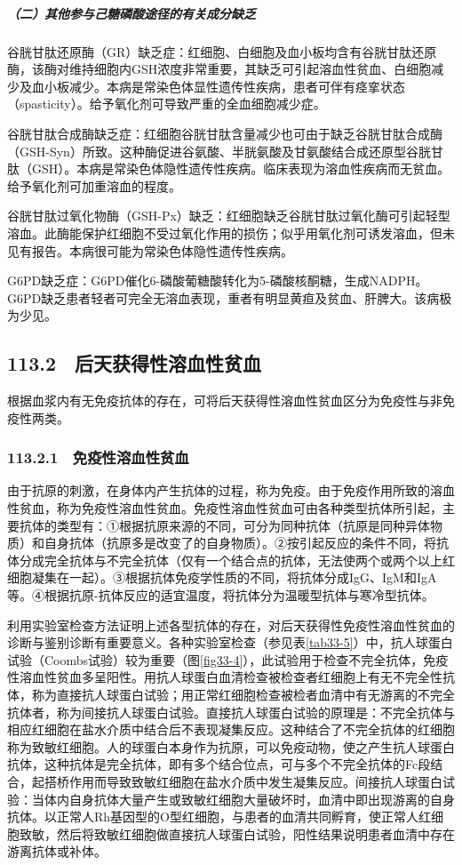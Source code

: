 \subparagraph{（二）其他参与己糖磷酸途径的有关成分缺乏}

谷胱甘肽还原酶（GR）缺乏症：红细胞、白细胞及血小板均含有谷胱甘肽还原酶，该酶对维持细胞内GSH浓度非常重要，其缺乏可引起溶血性贫血、白细胞减少及血小板减少。本病是常染色体显性遗传性疾病，患者可伴有痉挛状态（spasticity）。给予氧化剂可导致严重的全血细胞减少症。

谷胱甘肽合成酶缺乏症：红细胞谷胱甘肽含量减少也可由于缺乏谷胱甘肽合成酶（GSH-Syn）所致。这种酶促进谷氨酸、半胱氨酸及甘氨酸结合成还原型谷胱甘肽（GSH）。本病是常染色体隐性遗传性疾病。临床表现为溶血性疾病而无贫血。给予氧化剂可加重溶血的程度。

谷胱甘肽过氧化物酶（GSH-Px）缺乏：红细胞缺乏谷胱甘肽过氧化酶可引起轻型溶血。此酶能保护红细胞不受过氧化作用的损伤；似乎用氧化剂可诱发溶血，但未见有报告。本病很可能为常染色体隐性遗传性疾病。

G6PD缺乏症：G6PD催化6-磷酸葡糖酸转化为5-磷酸核酮糖，生成NADPH。G6PD缺乏患者轻者可完全无溶血表现，重者有明显黄疸及贫血、肝脾大。该病极为少见。

\protect\hypertarget{text00260.html}{}{}

\subsection{113.2　后天获得性溶血性贫血}

根据血浆内有无免疫抗体的存在，可将后天获得性溶血性贫血区分为免疫性与非免疫性两类。

\subsubsection{113.2.1　免疫性溶血性贫血}

由于抗原的刺激，在身体内产生抗体的过程，称为免疫。由于免疫作用所致的溶血性贫血，称为免疫性溶血性贫血。免疫性溶血性贫血可由各种类型抗体所引起，主要抗体的类型有：①根据抗原来源的不同，可分为同种抗体（抗原是同种异体物质）和自身抗体（抗原多是改变了的自身物质）。②按引起反应的条件不同，将抗体分成完全抗体与不完全抗体（仅有一个结合点的抗体，无法使两个或两个以上红细胞凝集在一起）。③根据抗体免疫学性质的不同，将抗体分成IgG、IgM和IgA等。④根据抗原-抗体反应的适宜温度，将抗体分为温暖型抗体与寒冷型抗体。

利用实验室检查方法证明上述各型抗体的存在，对后天获得性免疫性溶血性贫血的诊断与鉴别诊断有重要意义。各种实验室检查（参见表\ref{tab33-5}）中，抗人球蛋白试验（Coombs试验）较为重要（图\ref{fig33-4}），此试验用于检查不完全抗体，免疫性溶血性贫血多呈阳性。用抗人球蛋白血清检查被检查者红细胞上有无不完全性抗体，称为直接抗人球蛋白试验；用正常红细胞检查被检者血清中有无游离的不完全抗体者，称为间接抗人球蛋白试验。直接抗人球蛋白试验的原理是：不完全抗体与相应红细胞在盐水介质中结合后不表现凝集反应。这种结合了不完全抗体的红细胞称为致敏红细胞。人的球蛋白本身作为抗原，可以免疫动物，使之产生抗人球蛋白抗体，这种抗体是完全抗体，即有多个结合位点，可与多个不完全抗体的Fc段结合，起搭桥作用而导致致敏红细胞在盐水介质中发生凝集反应。间接抗人球蛋白试验：当体内自身抗体大量产生或致敏红细胞大量破坏时，血清中即出现游离的自身抗体。以正常人Rh基因型的O型红细胞，与患者的血清共同孵育，使正常人红细胞致敏，然后将致敏红细胞做直接抗人球蛋白试验，阳性结果说明患者血清中存在游离抗体或补体。

